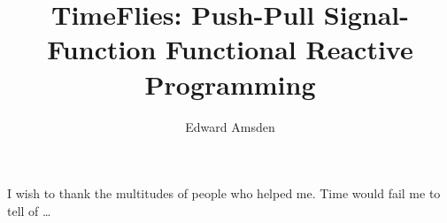 \documentclass[12pt]{report}    %
\author{Edward Amsden }    %
\title{TimeFlies: Push-Pull Signal-Function Functional Reactive Programming}
\theoremstyle{definition}
\theoremstyle{remark}
\begin{document}


%
%
%
\titlepage              %
\commcertpage           %




%


\begin{acknowledgments}     %
%
I wish to thank the multitudes of people who helped me. Time would
fail me to tell of \ldots
\end{acknowledgments}


%
\utabstract
{}%
\indent




\tableofcontents   %

\listoffigures     %



%
%
\end{document}
